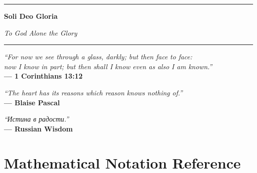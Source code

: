 \documentclass[11pt,a4paper]{article}
\theoremstyle{definition}
\theoremstyle{remark}
\begin{document}
\begin{center}
\rule{0.6\textwidth}{0.5pt}

\Large\textbf{Soli Deo Gloria}

\textit{To God Alone the Glory}

\rule{0.6\textwidth}{0.5pt}

\vspace{0.5cm}

\normalsize
\textit{``For now we see through a glass, darkly; but then face to face:\\
now I know in part; but then shall I know even as also I am known.''}\\
\textbf{— 1 Corinthians 13:12}

\vspace{0.5cm}

\textit{``The heart has its reasons which reason knows nothing of.''}\\
\textbf{— Blaise Pascal}

\vspace{0.5cm}

\textit{``Истина в радости.''}\\
\textbf{— Russian Wisdom}

\end{center}

\newpage

\appendix

\section{Mathematical Notation Reference}
\end{document}
